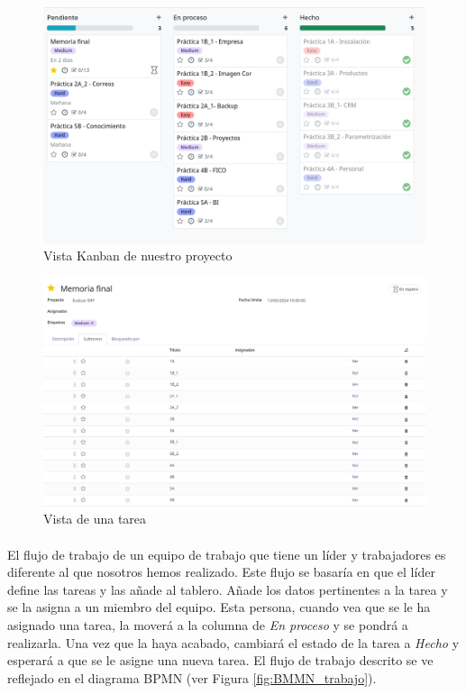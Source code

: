 \begin{figure}[h]
    \centering
    \includegraphics[width=1\linewidth]{proyecto.png}
    \caption{Vista Kanban de nuestro proyecto}
\end{figure}

\begin{figure}[h]
    \centering
    \includegraphics[width=0.75\linewidth]{tareaMemoria.png}
    \caption{Vista de una tarea}
\end{figure}
\paragraph{}
El flujo de trabajo de un equipo de trabajo que tiene un líder y trabajadores es diferente al que nosotros hemos realizado. Este flujo se basaría en que el líder define las tareas y las añade al tablero. Añade los datos pertinentes a la tarea y se la asigna a un miembro del equipo. Esta persona, cuando vea que se le ha asignado una tarea, la moverá a la columna de \textit{En proceso} y se pondrá a realizarla. Una vez que la haya acabado, cambiará el estado de la tarea a \textit{Hecho} y esperará a que se le asigne una nueva tarea. El flujo de trabajo descrito se ve reflejado en el diagrama BPMN (ver Figura \ref{fig:BMMN_trabajo}). 

